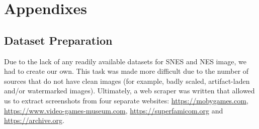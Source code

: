 \documentclass[10pt,twocolumn,letterpaper]{article}
\begin{document}
%

%

%
%



%

\section{Appendixes}
\subsection{Dataset Preparation}
Due to the lack of any readily available datasets for SNES and NES image, we had to create our own.
This task was made more difficult due to the number of sources that do not have clean images (for example, badly scaled, artifact-laden and/or watermarked images).
Ultimately, a web scraper was written that allowed us to extract screenshots from four separate websites: \url{https://mobygames.com}, \url{https://www.video-games-museum.com}, \url{https://superfamicom.org} and \url{https://archive.org}.
\end{document}
